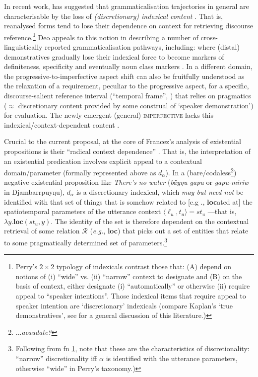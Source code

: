 In recent work, \citet{Deo2017a} has suggested that grammaticalisation trajectories in general are characterisable by the loss of \textit{(discretionary) indexical content} \citep[\textit{e.g.,}][]{Perry2012,Perry2017}. That is, reanalysed forms tend to lose their dependence on context for retrieving discourse reference.\footnote{Perry's \citeyearpar[68ff, a.o.]{Perry2012} $2\times 2${} typology of indexicals contrast those that: (A) depend on notions of (i) ``wide'' vs. (ii) ``narrow'' context to designate and (B) on the basis of context, either designate (i) ``automatically'' or otherwise (ii) require appeal to ``speaker intentions''.\label{perry1} Those indexical items that require appeal to speaker intention are `discretionary' indexicals (compare Kaplan's `true demonstratives', see \citealt	{Braun2017} for a general discussion of this literature.)} Deo appeals to this notion in describing a number of cross-linguistically reported grammaticalisation pathways, including: where (distal) demonstratives gradually lose their indexical force to become markers of definiteness, specificity and eventually noun class markers \citep[see also][61]{Greenberg1978,deMulder2011,Stevens2007}. In a different domain, the progressive-to-imperfective aspect shift can also be fruitfully understood as the relaxation of a requirement, peculiar to the progressive aspect, for a specific, discourse-salient reference interval (``temporal frame'', \citealt{Kearns1991}) that relies on pragmatics ($\approx$ discretionary content provided by some construal of `speaker demonstration') for evaluation. The newly emergent (general) \textsc{imperfective}  lacks this indexical/context-dependent content \citep[see][]{Deo2015a,Fuchs2020}.

Crucial to the current proposal, at the core of Francez's analysis of existential propositions is their ``radical context dependence'' \citeyearpar[2]{Francez2007}. That is, the interpretation of an existential predication involves explicit appeal to a contextual domain/parameter (formally represented above as $ d_\alpha $). In a (bare/codaless\footnote{...\textit{acaudate?}}) negative existential proposition like \textit{There's no water} (\textit{bäyŋu gapu} or \textit{gapu-miriw} in Djambarrpuyŋu), $ d_\alpha $ is a discretionary indexical, which \textit{may but need not} be identified with that set of things that is somehow related to [e.g	., \textbf{loc}ated at] the spatiotemporal parameters of the utterance context $ \langle\ell_u,t_u\rangle =st_u$ \citep[72]{Francez2007}---that is, $ \lambda y.\textbf{loc}(st_u,y) $. The identity of the set is therefore dependent on the contextual retrieval of some relation $\mathcal R $ (\textit{e.g.}, \textbf{loc}) that picks out a set of entities that relate to some pragmatically determined set of parameters.\footnote{Following from fn \ref{perry1}, note that these are the characteristics of discretionality: ``narrow'' discretionality iff $ \alpha $ is identified with the utterance parameters, otherwise ``wide'' in Perry's taxonomy.)}


